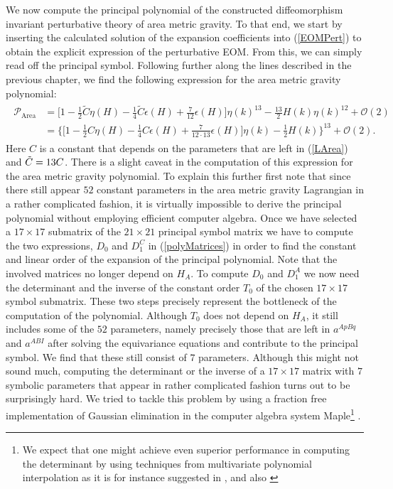 We now compute the principal polynomial of the constructed diffeomorphism invariant perturbative theory of area metric gravity. To that end, we start by inserting the calculated solution of the expansion coefficients into (\ref{EOMPert}) to obtain the explicit expression of the perturbative EOM. From this, we can simply read off the principal symbol. Following further along the lines described in the previous chapter, we find the following expression for the area metric gravity polynomial:
\begin{align} \label{AreaPoly}
\begin{aligned}
    \mathcal{P}_{\text{Area}} &= \bigl[1 - \frac{1}{2} \tilde{C}\eta(H) - \frac{1}{4} \tilde{C} \epsilon(H) + \frac{7}{12} \epsilon(H) \bigr] \eta(k)^{13} - \frac{13}{2}H(k) \eta(k)^{12} + \mathcal{O}(2) \\
    &=\bigl\{  \bigl[ 1 - \frac{1}{2} C \eta(H) - \frac{1}{4} C \epsilon(H) +  \frac{7}{12\cdot13} \epsilon(H) \bigr] \eta(k) - \frac{1}{2} H(k)       \bigr\}^{13} + \mathcal{O}(2).
\end{aligned}
\end{align}
Here $C$ is a constant that depends on the parameters that are left in (\ref{LArea}) and $\Tilde{C} = 13 C$.
There is a slight caveat in the computation of this expression for the area metric gravity polynomial. 
To explain this further first note that since there still appear $52$ constant parameters in the area metric gravity Lagrangian in a rather complicated fashion, it is virtually impossible to derive the principal polynomial without employing efficient computer algebra. Once we have selected a $17 \times 17$ submatrix of the $21 \times 21$ principal symbol matrix we have to compute the two expressions, $D_0$ and $D_{1}^C$ in (\ref{polyMatrices}) in order to find the constant and linear order of the expansion of the principal polynomial. Note that the involved matrices no longer depend on $H_A$. To compute $D_0$ and $D_1^A$ we now need the determinant and the inverse of the constant order $T_0$ of the chosen $17 \times 17$ symbol submatrix. These two steps precisely represent the bottleneck of the computation of the polynomial. Although $T_0$ does not depend on $H_A$, it still includes some of the $52$ parameters, namely precisely those that are left in $a^{ApBq}$ and $a^{ABI}$ after solving the equivariance equations and contribute to the principal symbol. We find that these still consist of $7$ parameters. Although this might not sound much, computing the determinant or the inverse of a $17 \times 17$ matrix with $7$ symbolic parameters that appear in rather complicated fashion turns out to be surprisingly hard. We tried to tackle this problem by using a fraction free implementation of Gaussian elimination in the computer algebra system Maple\footnote{We expect that one might achieve even superior performance in computing the determinant by using techniques from multivariate polynomial interpolation as it is for instance suggested in \cite{Qin2018}, \cite{MARCO2004749} and also \cite{articleDet}} \cite{Maple}.

